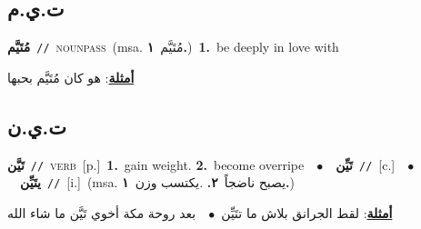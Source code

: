 \documentclass[10pt,a4paper,twoside]{article} %
\begin{document}
\begin{multicols}{2}
\vspace{-3mm}
\subsection*{\color{blue}\foreignlanguage{arabic}{ت.ي.م}\color{blue}{}} 

{\setlength\topsep{0pt}\textbf{\foreignlanguage{arabic}{مُتَيَّم}}\ {\color{gray}\texttt{//}\color{black}}\ \textsc{noun\textunderscore pass}\ \color{gray}(msa. \foreignlanguage{arabic}{مُتَيَّم}~\foreignlanguage{arabic}{\textbf{١.}})\color{black}\ \textbf{1.}~be deeply in love with\  \begin{flushright}\color{gray}\foreignlanguage{arabic}{\textbf{\underline{\foreignlanguage{arabic}{أمثلة}}}: هو كان مُتَيَّم بحبها}\end{flushright}\color{black}} \vspace{2mm}

\vspace{-3mm}
\subsection*{\color{blue}\foreignlanguage{arabic}{ت.ي.ن}\color{blue}{}} 

{\setlength\topsep{0pt}\textbf{\foreignlanguage{arabic}{تَيَّن}}\ {\color{gray}\texttt{//}\color{black}}\ \textsc{verb}\ [p.]\ \textbf{1.}~gain weight.  \textbf{2.}~become overripe\ \ $\bullet$\ \ \setlength\topsep{0pt}\textbf{\foreignlanguage{arabic}{تَيِّن}}\ {\color{gray}\texttt{//}\color{black}}\ [c.]\ \ $\bullet$\ \ \setlength\topsep{0pt}\textbf{\foreignlanguage{arabic}{يتَيِّن}}\ {\color{gray}\texttt{//}\color{black}}\ [i.]\ \color{gray}(msa. \foreignlanguage{arabic}{يصبح ناضجاً}~\foreignlanguage{arabic}{\textbf{٢.}}  .\foreignlanguage{arabic}{يكتسب وزن}~\foreignlanguage{arabic}{\textbf{١.}})\color{black}\  \begin{flushright}\color{gray}\foreignlanguage{arabic}{\textbf{\underline{\foreignlanguage{arabic}{أمثلة}}}: لقط الجرانق بلاش ما تتَيِّن\ $\bullet$\ \  بعد روحة مكة أخوي تَيَّن ما شاء الله}\end{flushright}\color{black}} \vspace{2mm}


\end{multicols}
\end{document}
